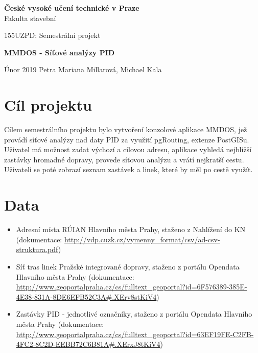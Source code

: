\documentclass[a4paper, 12pt]{article}
\begin{document}
\begin{titlepage}
\begin{center}
\noindent
\Large \textbf{České vysoké učení technické v Praze }\\ Fakulta stavební
\vspace{5cm}

\Large


\vspace{4cm}

155UZPD: Semestrální projekt \\
\Huge

\textbf{MMDOS - Síťové analýzy PID}
\vspace{11cm}

\large
Únor 2019 \hspace{5cm} Petra Mariana Millarová, Michael Kala\\

\end{center}

\end{titlepage}




\pagestyle{plain}     %
\setcounter{page}{1}  %


\section{Cíl projektu}
Cílem semestrálního projektu bylo vytvoření konzolové aplikace MMDOS, jež provádí síťové analýzy nad daty PID za využití pgRouting, extenze PostGISu. Uživatel má možnost zadat výchozí a cílovou adresu, aplikace vyhledá nejbližší zastávky hromadné dopravy, provede síťovou analýzu a vrátí nejkratší cestu. Uživateli se poté zobrazí seznam zastávek a linek, které by měl po cestě využít.

\newpage
\section{Data}
\begin{itemize}
	\item Adresní místa RÚIAN Hlavního města Prahy, staženo z Nahlížení do KN (dokumentace: \url{http://vdp.cuzk.cz/vymenny_format/csv/ad-csv-struktura.pdf})
	\item Síť tras linek Pražské integrované dopravy, staženo z portálu Opendata Hlavního města Prahy (dokumentace: \url{http://www.geoportalpraha.cz/cs/fulltext_geoportal?id=6F576389-385E-4E38-831A-8DE6EFB52C3A#.XErv8stKiV4})
	\item Zastávky PID - jednotlivé označníky, staženo z portálu Opendata Hlavního města Prahy (dokumentace: \url{http://www.geoportalpraha.cz/cs/fulltext_geoportal?id=63EF19FE-C2FB-4FC2-8C2D-EEBB72C6B81A#.XErxJ8tKiV4})
\end{itemize}
\end{document}
